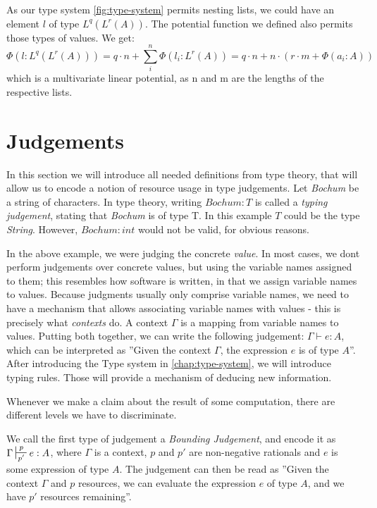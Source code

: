 As our type system \ref{fig:type-system} permits nesting lists, we could have an element $l$ of type $L^q(L^r(A))$. The potential function we defined also permits those types of values. We get: 
$$\Phi(l : L^q(L^r(A))) = q \cdot n + \displaystyle\sum_{i}^{n} \Phi(l_i : L^r(A)) = q \cdot n + n \cdot (r \cdot m + \Phi(a_i : A)) $$ 
which is a multivariate linear potential, as n and m are the lengths of the respective lists.





\section{Judgements}
 In this section we will introduce all needed definitions from type theory, that will allow us to encode a notion of resource usage in type judgements.
 Let \emph{Bochum} be a string of characters. In type theory, writing \(Bochum: T\) is called a \emph{typing judgement}, stating that \emph{Bochum} is of type T. In this example \(T\) could be the type \emph{String}. However, \(Bochum : int\) would not be valid, for obvious reasons.
 
 In the above example, we were judging the concrete \emph{value}. In most cases, we dont perform judgements over concrete values, but using the variable names assigned to them; this resembles how software is written, in that we assign variable names to values.
 Because judgments usually only comprise variable names, we need to have a mechanism that allows associating variable names with values - this is precisely what \emph{contexts} do. A context \(\Gamma\) is a mapping from variable names to values. Putting both together, we can write the following judgement: \(\Gamma \vdash e: A\), which can be interpreted as ''Given the context \(\Gamma\), the expression \(e\) is of type \(A\)''.
 After introducing the Type system in \ref{chap:type-system}, we will introduce typing rules. Those will provide a mechanism of deducing new information. 
 
Whenever we make a claim about the result of some computation, there are different levels we have to discriminate.

 We call the first type of judgement a \emph{Bounding Judgement}, and encode it as \(\Gamma \sststile{p'}{p} e : A\), where \(\Gamma\) is a context, \(p\) and \(p'\) are non-negative rationals and \(e\) is some expression of type \(A\). The judgement can then be read as ''Given the context \(\Gamma\) and \(p\) resources, we can evaluate the expression \(e\) of type \(A\), and we have \(p'\) resources remaining''.

